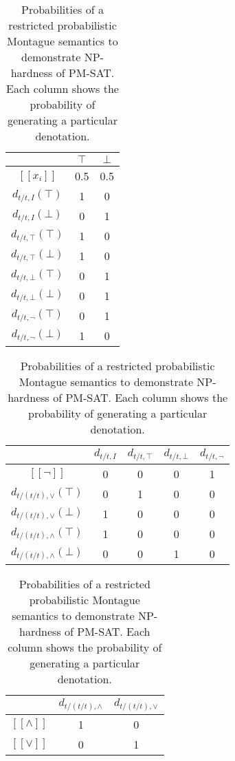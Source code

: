 \documentclass[a4paper,11pt]{article}
\theoremstyle{definition}
\newcommand{\interp}[1]{[\![ #1 ]\!]}
\begin{document}
\begin{table}
\hfill
\begin{tabular}{c|c|c}
 & $\top$ & $\bot$ \\
\hline
$\interp{x_i}$ & 0.5 & 0.5 \\
$d_{t/t,I}(\top)$ & 1 & 0\\
$d_{t/t,I}(\bot)$ & 0 & 1\\
$d_{t/t,\top}(\top)$ & 1 & 0\\
$d_{t/t,\top}(\bot)$ & 1 & 0\\
$d_{t/t,\bot}(\top)$ & 0 & 1\\
$d_{t/t,\bot}(\bot)$ & 0 & 1\\
$d_{t/t,\lnot}(\top)$ & 0 & 1\\
$d_{t/t,\lnot}(\bot)$ & 1 & 0
\end{tabular}\hfill
\begin{minipage}[c][4.6cm]{0.5\linewidth}
\centering
\begin{tabular}{c|c|c|c|c}
 & $d_{t/t,I}$ & $d_{t/t,\top}$ & $d_{t/t,\bot}$ & $d_{t/t,\lnot}$ \\
\hline
$\interp{\lnot}$ & 0 & 0 & 0 & 1 \\
$d_{t/(t/t),\lor}(\top)$ & 0 & 1 & 0 & 0\\
$d_{t/(t/t),\lor}(\bot)$ & 1 & 0 & 0 & 0\\
$d_{t/(t/t),\land}(\top)$ & 1 & 0 & 0 & 0\\
$d_{t/(t/t),\land}(\bot)$ & 0 & 0 & 1 & 0\\
\end{tabular}%
\vfill
\begin{tabular}{c|c|c}
 & $d_{t/(t/t),\land}$ & $d_{t/(t/t),\lor}$ \\
\hline
$\interp{\land}$ & 1 & 0 \\
$\interp{\lor}$ & 0 & 1 \\
\end{tabular}%
\end{minipage}%
\hspace*{\fill}
\caption{Probabilities of a restricted probabilistic Montague
  semantics to demonstrate NP-hardness of PM-SAT. Each column shows
  the probability of generating a particular denotation.}
\label{table:pmsat}
\end{table}
\end{document}
